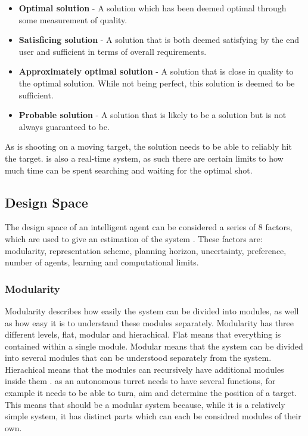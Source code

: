 \begin{itemize}
  \item \textbf{Optimal solution} - A solution which has been deemed optimal
  through some measurement of quality.
  \item \textbf{Satisficing solution} - A solution that is both deemed
  satisfying by the end user and sufficient in terms of overall requirements. 
  \item \textbf{Approximately optimal solution} - A solution that is close in
  quality to the optimal solution. While not being perfect, this solution is
  deemed to be sufficient.
  \item \textbf{Probable solution} - A solution that is likely to be a solution
  but is not always guaranteed to be.
\end{itemize}

As \name is shooting on a moving target, the solution needs to be able
to  reliably hit the target. \name is also a real-time system, as such there are
certain limits to how much time can be spent searching and waiting for the
optimal shot.

\subsection{Design Space}
The design space of an intelligent agent can be considered a series of 8
factors, which are used to give an estimation of the system \citep[Ch.
1.5]{MIBook}. These factors are: modularity, representation scheme, planning
horizon, uncertainty, preference, number of agents, learning and computational
limits.

\subsubsection{Modularity}
Modularity describes how easily the system can be divided into modules, as well
as how easy it is to understand these modules separately. Modularity has three
different levels, flat, modular and hierachical. Flat means that everything is
contained within a single module. Modular means that the system can be divided
into several modules that can be understood separately from the system.
Hierachical means that the modules can recursively have additional modules
inside them \citep[Ch 1.5.1]{MIBook}. \name as an autonomous turret needs to
have several functions, for example it needs to be able to turn, aim and determine the position of a target.
This means that \name should be a modular system because, while it is a
relatively simple system, it has distinct parts which can each be considred
modules of their own.

